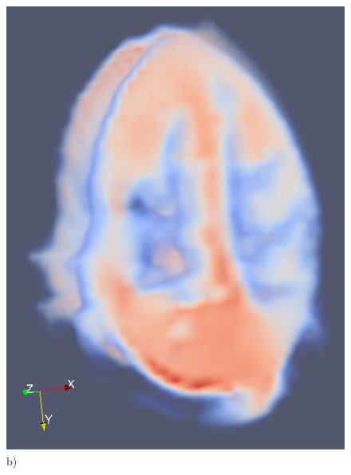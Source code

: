 \documentclass{scrartcl}
\begin{document}
\begin{figure}[!t]
\begin{minipage}{0.3\textwidth}
    \includegraphics[width=\textwidth]{img_new/brain_volume2.PNG}
    \label{b)}
    b)
  \end{minipage}
  \begin{minipage}{0.3\textwidth}
    \centering

\end{minipage}
\end{figure}
\end{document}

